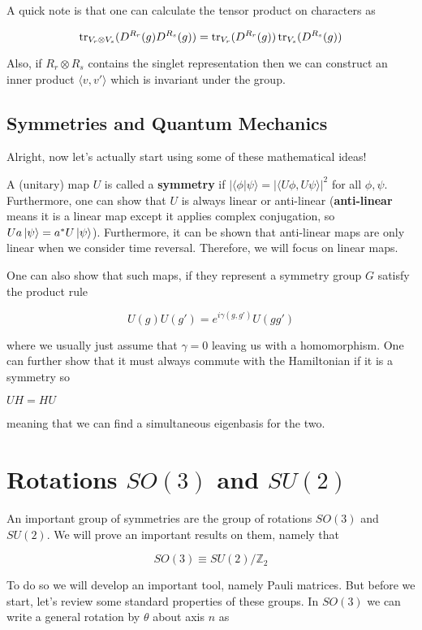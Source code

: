 \documentclass{article}
\theoremstyle{definition}
\begin{document}
A quick note is that one can calculate the tensor product on characters as

$$ \tr_{V_r \otimes V_s}(D^{R_r} (g) D^{R_s}(g)) = \tr_{V_r} (D^{R_r}(g))
\tr_{V_s} (D^{R_s}(g)) $$

Also, if $R_r \otimes R_s$ contains the singlet representation then we can
construct an inner product $\langle v, v' \rangle$ which is invariant under the
group.

\subsection{Symmetries and Quantum Mechanics}

Alright, now let's actually start using some of these mathematical ideas!

A (unitary) map $U$ is called a \textbf{symmetry} if $|\langle \phi | \psi
\rangle = |\langle U\phi, U\psi \rangle|^2$ for all $\phi, \psi$. Furthermore,
one can show that $U$ is always linear or anti-linear (\textbf{anti-linear}
means it is a linear map except it applies complex conjugation, so $Ua\ket{\psi}
= a^*U\ket{\psi}$). Furthermore, it can be shown that anti-linear maps are only
linear when we consider time reversal. Therefore, we will focus on linear maps.

One can also show that such maps, if they represent a symmetry group $G$ satisfy
the product rule

$$U(g) U(g') = e^{i\gamma(g, g')}U(gg')$$

where we usually just assume that $\gamma = 0$ leaving us with a homomorphism.
One can further show that it must always commute with the Hamiltonian if it is a
symmetry so

$UH = HU$

meaning that we can find a simultaneous eigenbasis for the two.

\section{Rotations $SO(3)$ and $SU(2)$}

An important group of symmetries are the group of rotations $SO(3)$ and $SU(2)$.
We will prove an important results on them, namely that

$$ SO(3) \equiv SU(2) / \mathbb{Z}_2 $$

To do so we will develop an important tool, namely Pauli matrices. But before we
start, let's review some standard properties of these groups. In $SO(3)$ we can
write a general rotation by $\theta$ about axis $n$ as
\end{document}
